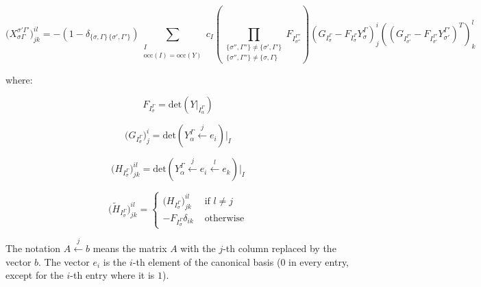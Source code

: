 \documentclass[a4paper,11pt]{article}
\begin{document}
\begin{equation}
  \big( X_{\sigma \Gamma}^{\sigma' \Gamma'} \big)_{jk}^{il} =
  -\left( 1 - \delta_{\{\sigma,\Gamma\} \, \{\sigma',\Gamma'\}} \right)
  \sum_{\substack{I\\\text{occ}(I) = \text{occ}(Y)}} c_I
  \left(
    \prod_{\substack{
        \{\sigma'', \Gamma''\} \ne \{\sigma', \Gamma'\} \\
        \{\sigma'', \Gamma''\} \ne \{\sigma , \Gamma \}}}
    F_{I_{\sigma''}^{\Gamma''}} \right)
  \left( G_{I_\sigma^\Gamma} - F_{I_\sigma^\Gamma} Y_\sigma^\Gamma  \right)_j^i
  \left( \left( G_{I_{\sigma'}^{\Gamma'}} - F_{I_{\sigma'}^{\Gamma'}} Y_{\sigma'}^{\Gamma'} \right)^T \right)_k^l
\end{equation}

where:

\begin{equation}
  F_{I_\sigma^\Gamma} = \text{det} \left( Y\big|_{I_\alpha^\Gamma} \right)
\end{equation}

\begin{equation}
  \big( G_{I_\sigma^\Gamma} \big)_j^i = \text{det} \left( Y_\alpha^\Gamma \overset{j}{\leftarrow} e_i \right) \big|_I
\end{equation}

\begin{equation}
  \big( H_{I_\sigma^\Gamma} \big)_{jk}^{il} =
  \text{det} \left( Y_\alpha^\Gamma \overset{j}{\leftarrow} e_i
    \overset{l}{\leftarrow} e_k \right) \big|_I
\end{equation}

\begin{equation}
  \big( \tilde{H}_{I_\sigma^\Gamma} \big)_{jk}^{il} =
  \left\{
    \begin{array}{ll}
      \big( H_{I_\sigma^\Gamma} \big)_{jk}^{il} & \text{ if } l \ne j\\
      -F_{I_\sigma^\Gamma} \delta_{ik} & \text{ otherwise}
    \end{array}
  \right.
\end{equation}

The notation $A \overset{j}{\leftarrow}b$ means the matrix $A$ with the $j$-th column replaced by the vector $b$. The vector $e_i$ is the $i$-th element of the canonical basis ($0$ in every entry, except for the $i$-th entry where it is $1$).
\end{document}
